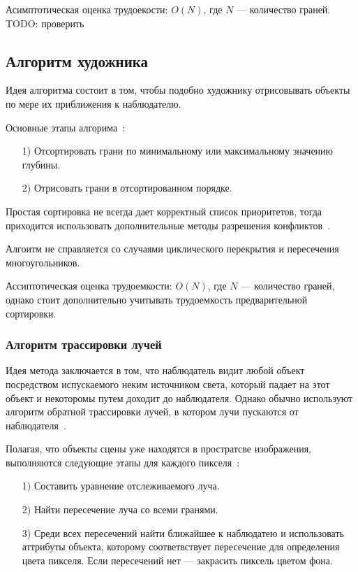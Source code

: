 Асимптотическая оценка трудоекости: $O(N)$, где $N$ --- количество граней. TODO: проверить

\subsection{Алгоритм художника}

Идея алгоритма состоит в том, чтобы подобно художнику отрисовывать объекты по мере их приближения к наблюдателю.

Основные этапы алгорима~\cite{rogers}:
\begin{enumerate}
    \item[1)] Отсортировать грани по минимальному или максимальному значению глубины.
    \item[2)] Отрисовать грани в отсортированном порядке.
\end{enumerate}

Простая сортировка не всегда дает корректный список приоритетов, тогда приходится использовать дополнительные методы разрешения конфликтов~\cite{rogers}.

Алгоитм не справляется со случаями циклического перекрытия и пересечения многоугольников.

Ассиптотическая оценка трудоемкости: $O(N)$, где $N$ --- количество граней, однако стоит дополнительно учитывать трудоемкость предварительной сортировки.

\subsubsection{Алгоритм трассировки лучей}
Идея метода заключается в том, что наблюдатель видит любой объект посредством испускаемого неким источником света, который падает на этот объект и некоторомы путем доходит до наблюдателя. Однако обычно используют алгоритм обратной трассировки лучей, в котором лучи пускаются от наблюдателя~\cite{rogers}.

Полагая, что объекты сцены уже находятся в простратсве изображения, выполняются следующие этапы для каждого пикселя~\cite{rogers}:

\begin{enumerate}
    \item[1)] Составить уравнение отслеживаемого луча.
    \item[2)] Найти пересечение луча со всеми гранями.
    \item[3)] Среди всех пересечений найти ближайшее к наблюдатею и использовать аттрибуты объекта, которому соответвствует пересечение для определения цвета пикселя. Если пересечений нет --- закрасить пиксель цветом фона.
\end{enumerate}


